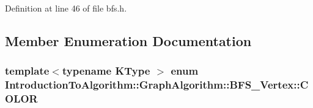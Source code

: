 Definition at line 46 of file bfs.\+h.



\subsection{Member Enumeration Documentation}
\hypertarget{struct_introduction_to_algorithm_1_1_graph_algorithm_1_1_b_f_s___vertex_a3f00f12565def71750f1f163e0e52305}{}
\subsubsection[{C\+O\+L\+O\+R}]{\setlength{\rightskip}{0pt plus 5cm}template$<$typename K\+Type $>$ enum {\bf Introduction\+To\+Algorithm\+::\+Graph\+Algorithm\+::\+B\+F\+S\+\_\+\+Vertex\+::\+C\+O\+L\+O\+R}\hspace{0.3cm}{\ttfamily [strong]}}\label{struct_introduction_to_algorithm_1_1_graph_algorithm_1_1_b_f_s___vertex_a3f00f12565def71750f1f163e0e52305}
